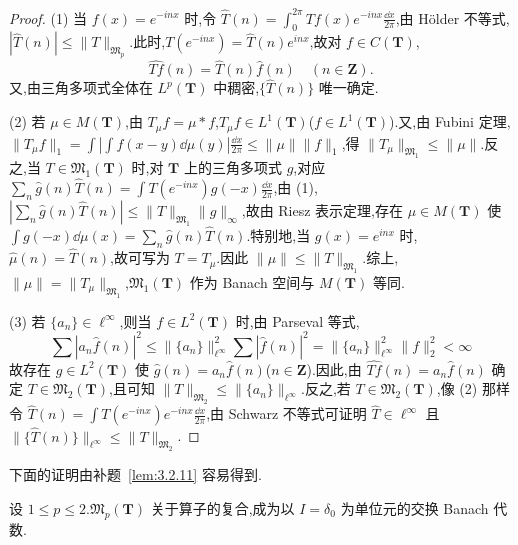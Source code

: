 \begin{proof}
(1) 当 $f(x) = e^{-inx}$ 时,令 $\hat{T}(n) = \int_{0}^{2\pi}Tf(x)e^{-inx}\frac{\dd x}{2\pi}$,由 Hölder 不等式,$|\hat{T}(n)| \leq \|T\|_{\mathfrak{M}_{p}}$.此时,$T(e^{-inx}) = \hat{T}(n)e^{inx}$,故对 $f \in C(\mathbf{T})$,
\begin{equation*}
\widehat{Tf}(n) = \hat{T}(n)\hat{f}(n) \quad (n \in \mathbf{Z}).
\end{equation*}
又,由三角多项式全体在 $L^{p}(\mathbf{T})$ 中稠密,$\{\hat{T}(n)\}$ 唯一确定.

(2) 若 $\mu \in M(\mathbf{T})$,由 $T_{\mu}f = \mu * f$,$T_{\mu}f \in L^{1}(\mathbf{T})$($f \in L^{1}(\mathbf{T})$).又,由 Fubini 定理,$\|T_{\mu}f\|_{1} = \int\left|\int f(x - y)\dd\mu(y)\right|\frac{\dd x}{2\pi} \leq \|\mu\|\|f\|_{1}$,得 $\|T_{\mu}\|_{\mathfrak{M}_{1}} \leq \|\mu\|$.反之,当 $T \in \mathfrak{M}_{1}(\mathbf{T})$ 时,对 $\mathbf{T}$ 上的三角多项式 $g$,对应 $\sum_{n}\hat{g}(n)\hat{T}(n) = \int T(e^{-inx})g(-x)\frac{\dd x}{2\pi}$,由 (1),$\left|\sum_{n}\hat{g}(n)\hat{T}(n)\right| \leq \|T\|_{\mathfrak{M}_{1}}\|g\|_{\infty}$,故由 Riesz 表示定理,存在 $\mu \in M(\mathbf{T})$ 使 $\int g(-x)\dd\mu(x) = \sum_{n}\hat{g}(n)\hat{T}(n)$.特别地,当 $g(x) = e^{inx}$ 时,$\hat{\mu}(n) = \hat{T}(n)$,故可写为 $T = T_{\mu}$.因此 $\|\mu\| \leq \|T\|_{\mathfrak{M}_{1}}$.综上,$\|\mu\| = \|T_{\mu}\|_{\mathfrak{M}_{1}}$,$\mathfrak{M}_{1}(\mathbf{T})$ 作为 Banach 空间与 $M(\mathbf{T})$ 等同.

(3) 若 $\{a_{n}\} \in \ell^{\infty}$,则当 $f \in L^{2}(\mathbf{T})$ 时,由 Parseval 等式,
\begin{equation*}
\sum\left|a_{n}\hat{f}(n)\right|^{2} \leq \|\{a_{n}\}\|_{\ell^{\infty}}^{2}\sum|\hat{f}(n)|^{2} = \|\{a_{n}\}\|_{\ell^{\infty}}^{2}\|f\|_{2}^{2} < \infty
\end{equation*}
故存在 $g \in L^{2}(\mathbf{T})$ 使 $\hat{g}(n) = a_{n}\hat{f}(n)$($n \in \mathbf{Z}$).因此,由 $\widehat{Tf}(n) = a_{n}\hat{f}(n)$ 确定 $T \in \mathfrak{M}_{2}(\mathbf{T})$,且可知 $\|T\|_{\mathfrak{M}_{2}} \leq \|\{a_{n}\}\|_{\ell^{\infty}}$.反之,若 $T \in \mathfrak{M}_{2}(\mathbf{T})$,像 (2) 那样令 $\hat{T}(n) = \int T(e^{-inx})e^{-inx}\frac{\dd x}{2\pi}$,由 Schwarz 不等式可证明 $\hat{T} \in \ell^{\infty}$ 且 $\|\{\hat{T}(n)\}\|_{\ell^{\infty}} \leq \|T\|_{\mathfrak{M}_{2}}$.
\end{proof}

下面的证明由补题~\ref{lem:3.2.11} 容易得到.

\begin{theorem}\label{thm:3.2.12}
设 $1 \leq p \leq 2$.$\mathfrak{M}_{p}(\mathbf{T})$ 关于算子的复合,成为以 $I = \delta_{0}$ 为单位元的交换 Banach 代数.
\end{theorem}

